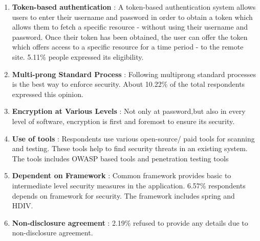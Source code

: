 \begin{enumerate}
    \item \textbf{Token-based authentication} : A token-based authentication system allows users to enter their username and password in order to obtain a token which allows them to fetch a specific resource - without using their username and password. Once their token has been obtained, the user can offer the token which offers access to a specific resource for a time period - to the remote site. 5.11\% people expressed its eligibility.
    
    \item \textbf{Multi-prong Standard Process} : Following multiprong standard processes is the best way to enforce security. About 10.22\% of the total respondents expressed this opinion.
    
    
    \item \textbf{Encryption at Various Levels} : Not only at password,but also in every level of software, encryption is first and foremost to ensure its security.
    
    \item \textbf{Use of tools} : Respondents use various open-source/ paid tools for scanning  and testing. These tools help to find security threats in an existing system. The tools includes OWASP based tools and  penetration testing tools
    
    
    \item \textbf{Dependent on Framework} : Common framework provides basic to intermediate level security measures in the application. 6.57\% respondents depends on framework for security. The framework includes spring and  HDIV.
    
    
    \item \textbf{Non-disclosure agreement} : 2.19\% refused to provide any details due to non-disclosure agreement.
    

\end{enumerate}
